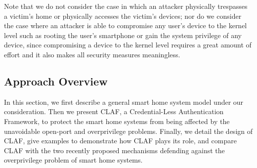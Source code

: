 \documentclass[letterpaper,12pt]{article}
\begin{document}
Note that we do not consider the case in which an attacker physically trespasses a victim's home or physically accesses the victim's devices; nor do we consider the case where an attacker is able to compromise any user's device to the kernel level such as rooting the user's smartphone or gain the system privilege of any device, since compromising a device to the kernel level requires a great amount of effort and it also makes all security measures meaningless.

\subsection{Approach Overview}
\label{subsec:claf-approach}
In this section, we first describe a general smart home system model under our consideration. Then we present CLAF, a Credential-Less Authentication Framework, to protect the smart home systems from being affected by the unavoidable open-port and overprivilege problems. Finally, we detail the design of CLAF, give examples to demonstrate how CLAF plays its role, and compare CLAF with the two recently proposed mechanisms defending against the overprivilege problem of smart home systems. 
\end{document}
